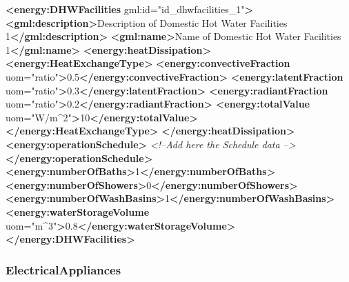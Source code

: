 \documentclass[a4paper,12pt]{article}
\newenvironment{Shaded}{}{}
\newcommand{\KeywordTok}[1]{\textcolor[rgb]{0.00,0.44,0.13}{\textbf{{#1}}}}
\newcommand{\StringTok}[1]{\textcolor[rgb]{0.25,0.44,0.63}{{#1}}}
\newcommand{\CommentTok}[1]{\textcolor[rgb]{0.38,0.63,0.69}{\textit{{#1}}}}
\newcommand{\OtherTok}[1]{\textcolor[rgb]{0.00,0.44,0.13}{{#1}}}
\newcommand{\NormalTok}[1]{{#1}}
\begin{document}
\begin{Shaded}
\begin{Highlighting}[]
\KeywordTok{<energy:DHWFacilities}\OtherTok{ gml:id=}\StringTok{"id_dhwfacilities_1"}\KeywordTok{>}
    \KeywordTok{<gml:description>}\NormalTok{Description of Domestic Hot Water Facilities 1}\KeywordTok{</gml:description>}
    \KeywordTok{<gml:name>}\NormalTok{Name of Domestic Hot Water Facilities 1}\KeywordTok{</gml:name>}
    \KeywordTok{<energy:heatDissipation>}
        \KeywordTok{<energy:HeatExchangeType>}
            \KeywordTok{<energy:convectiveFraction}\OtherTok{ uom=}\StringTok{"ratio"}\KeywordTok{>}\NormalTok{0.5}\KeywordTok{</energy:convectiveFraction>}
            \KeywordTok{<energy:latentFraction}\OtherTok{ uom=}\StringTok{"ratio"}\KeywordTok{>}\NormalTok{0.3}\KeywordTok{</energy:latentFraction>}
            \KeywordTok{<energy:radiantFraction}\OtherTok{ uom=}\StringTok{"ratio"}\KeywordTok{>}\NormalTok{0.2}\KeywordTok{</energy:radiantFraction>}
            \KeywordTok{<energy:totalValue}\OtherTok{ uom=}\StringTok{"W/m^2"}\KeywordTok{>}\NormalTok{10}\KeywordTok{</energy:totalValue>}
        \KeywordTok{</energy:HeatExchangeType>}
    \KeywordTok{</energy:heatDissipation>}
    \KeywordTok{<energy:operationSchedule>}
        \CommentTok{<!--Add here the Schedule data -->}  
    \KeywordTok{</energy:operationSchedule>}
    \KeywordTok{<energy:numberOfBaths>}\NormalTok{1}\KeywordTok{</energy:numberOfBaths>}
    \KeywordTok{<energy:numberOfShowers>}\NormalTok{0}\KeywordTok{</energy:numberOfShowers>}
    \KeywordTok{<energy:numberOfWashBasins>}\NormalTok{1}\KeywordTok{</energy:numberOfWashBasins>}
    \KeywordTok{<energy:waterStorageVolume}\OtherTok{ uom=}\StringTok{"m^3"}\KeywordTok{>}\NormalTok{0.8}\KeywordTok{</energy:waterStorageVolume>}
\KeywordTok{</energy:DHWFacilities>}
\end{Highlighting}
\end{Shaded}

\subsubsection{ElectricalAppliances}\label{electricalappliances}
\end{document}
